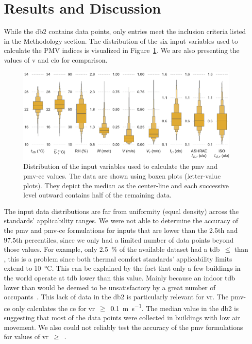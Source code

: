 \section{Results and Discussion}\label{sec:results}
While the \ac{db2} contains  data points, only  entries meet the inclusion criteria listed in the Methodology section.
The distribution of the six input variables used to calculate the PMV indices is visualized in Figure~\ref{fig:dist_input_data}.
We are also presenting the values of \ac{v} and \ac{clo} for comparison.
\begin{figure}[htb!]
    \centering
    \includegraphics[width=\textwidth]{figures/dist_input_data}
    \caption{Distribution of the input variables used to calculate the \ac{pmv} and \ac{pmv-ce} values.
    The data are shown using boxen plots (letter-value plots).
    They depict the median as the center-line and each successive level outward contains half of the remaining data.}
    \label{fig:dist_input_data}
\end{figure}
The input data distributions are far from uniformity (equal density) across the standards' applicability ranges.
We were not able to determine the accuracy of the \ac{pmv} and \ac{pmv-ce} formulations for inputs that are lower than the 2.5th and 97.5th percentiles, since we only had a limited number of data points beyond those values.
For example, only \qty{2.5}{\percent} of the available dataset had a \ac{tdb}~$\leq$ than , this is a problem since both thermal comfort standards' applicability limits extend to \qty{10}{\celsius}.
This can be explained by the fact that only a few buildings in the world operate at \ac{tdb} lower than this value.
Mainly because an indoor \ac{tdb} lower than  would be deemed to be unsatisfactory by a great number of occupants~\cite{iso7730}.
This lack of data in the \ac{db2} is particularly relevant for \ac{vr}.
The \ac{pmv-ce} only calculates the \ac{ce} for \ac{vr}~$\geq$~\qty{0.1}{\m\per\s}.
The median value in the \ac{db2} is  suggesting that most of the data points were collected in buildings with low air movement.
We also could not reliably test the accuracy of the \ac{pmv} formulations for values of \ac{vr}~$\geq$~.

